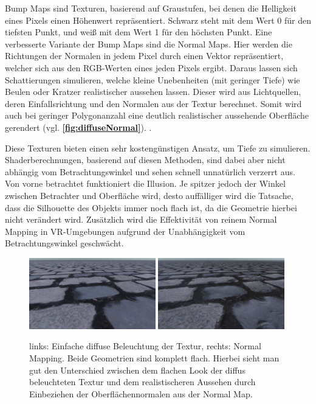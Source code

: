 Bump Maps sind Texturen, basierend auf Graustufen, bei denen die Helligkeit eines Pixels
einen Höhenwert repräsentiert. Schwarz steht mit dem Wert 0 für den tiefsten Punkt, und weiß mit dem Wert 1 für den höchsten Punkt.
Eine verbesserte Variante der Bump Maps sind die Normal Maps.
Hier werden die Richtungen der Normalen in jedem Pixel durch einen Vektor repräsentiert,
welcher sich aus den RGB-Werten eines jeden Pixels ergibt. Daraus lassen sich Schattierungen simulieren,
welche kleine Unebenheiten (mit geringer Tiefe) wie Beulen oder Kratzer realistischer aussehen lassen.
Dieser wird aus Lichtquellen, deren Einfallsrichtung und den Normalen aus der Textur berechnet.
Somit wird auch bei geringer Polygonanzahl eine deutlich realistischer aussehende Oberfläche gerendert (vgl. \textbf{\autoref{fig:diffuseNormal}}).
\parencite{Cohen1998}.

Diese Texturen bieten einen sehr kostengünstigen
Ansatz, um Tiefe zu simulieren. Shaderberechnungen, basierend auf diesen Methoden, sind dabei aber nicht abhängig
vom Betrachtungswinkel und sehen schnell unnatürlich verzerrt aus.
Von vorne betrachtet funktioniert die Illusion. Je spitzer jedoch der Winkel zwischen Betrachter und
Oberfläche wird, desto auffälliger wird die Tatsache, dass die Silhouette des Objekts immer
noch flach ist, da die Geometrie hierbei nicht verändert wird.
Zusätzlich wird die Effektivität von reinem Normal Mapping in VR-Umgebungen aufgrund der Unabhängigkeit vom Betrachtungswinkel
geschwächt. 

\begin{figure}[h!t]
	\centering
	\includegraphics[width=0.49\textwidth]{Grafiken/Basics/Mapping/Vergleich_Diffuse.png}
	\includegraphics[width=0.49\textwidth]{Grafiken/Basics/Mapping/Vergleich_Normal.png}
	\begin{footnotesize}
		\caption{links: Einfache diffuse Beleuchtung der Textur, rechts: Normal Mapping. Beide Geometrien sind komplett flach. 
		Hierbei sieht man gut den Unterschied zwischen dem flachen Look
		der diffus beleuchteten Textur und dem realistischeren Aussehen durch Einbeziehen der Oberflächennormalen aus der Normal Map.}
		\label{fig:diffuseNormal}
	\end{footnotesize}
\end{figure}

